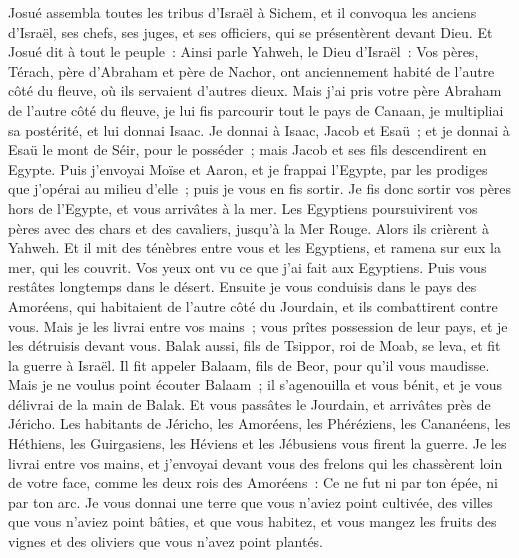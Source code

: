 \begin{multicols}{2}
\VerseOne{}Josué assembla toutes les tribus d'Israël à Sichem, et il convoqua les anciens d'Israël, ses chefs, ses juges, et ses officiers, qui se présentèrent devant Dieu.
Et Josué dit à tout le peuple~: Ainsi parle Yahweh, le Dieu d'Israël~: Vos pères, Térach, père d'Abraham et père de Nachor, ont anciennement habité de l'autre côté du fleuve, où ils servaient d'autres dieux.
Mais j'ai pris votre père Abraham de l'autre côté du fleuve, je lui fis parcourir tout le pays de Canaan, je multipliai sa postérité, et lui donnai Isaac.
Je donnai à Isaac, Jacob et Esaü~; et je donnai à Esaü le mont de Séir, pour le posséder~; mais Jacob et ses fils descendirent en Egypte.
Puis j'envoyai Moïse et Aaron, et je frappai l'Egypte, par les prodiges que j'opérai au milieu d'elle~; puis je vous en fis sortir.
Je fis donc sortir vos pères hors de l'Egypte, et vous arrivâtes à la mer. Les Egyptiens poursuivirent vos pères avec des chars et des cavaliers, jusqu'à la Mer Rouge.
Alors ils crièrent à Yahweh. Et il mit des ténèbres entre vous et les Egyptiens, et ramena sur eux la mer, qui les couvrit. Vos yeux ont vu ce que j'ai fait aux Egyptiens. Puis vous restâtes longtemps dans le désert.
Ensuite je vous conduisis dans le pays des Amoréens, qui habitaient de l'autre côté du Jourdain, et ils combattirent contre vous. Mais je les livrai entre vos mains~; vous prîtes possession de leur pays, et je les détruisis devant vous.
Balak aussi, fils de Tsippor, roi de Moab, se leva, et fit la guerre à Israël. Il fit appeler Balaam, fils de Beor, pour qu'il vous maudisse.
Mais je ne voulus point écouter Balaam~; il s'agenouilla et vous bénit, et je vous délivrai de la main de Balak.
Et vous passâtes le Jourdain, et arrivâtes près de Jéricho. Les habitants de Jéricho, les Amoréens, les Phéréziens, les Cananéens, les Héthiens, les Guirgasiens, les Héviens et les Jébusiens vous firent la guerre. Je les livrai entre vos mains,
et j'envoyai devant vous des frelons qui les chassèrent loin de votre face, comme les deux rois des Amoréens~: Ce ne fut ni par ton épée, ni par ton arc.
Je vous donnai une terre que vous n'aviez point cultivée, des villes que vous n'aviez point bâties, et que vous habitez, et vous mangez les fruits des vignes et des oliviers que vous n'avez point plantés.

\end{multicols}
